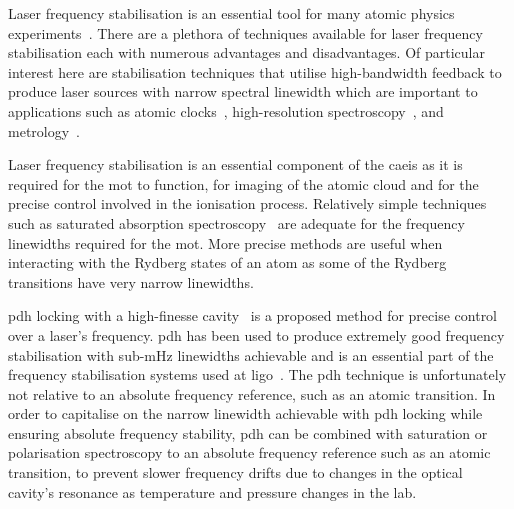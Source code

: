 
Laser frequency stabilisation is an essential tool for many atomic physics experiments~\cite{fox_1._2003,anderson_observation_1995,demarco_onset_1999,uetake_high_2008,ye_stable_2010,akamatsu_narrow_2012}.
There are a plethora of techniques available for laser frequency stabilisation each with numerous advantages and disadvantages.
Of particular interest here are stabilisation techniques that utilise high-bandwidth feedback to produce laser sources with narrow spectral linewidth which are important to applications such as atomic clocks~\cite{ludlow_sr_2008}, high-resolution spectroscopy~\cite{rafac_sub-dekahertz_2000}, and metrology~\cite{metcalf_laser_1999,ye_quantum_2008}.

Laser frequency stabilisation is an essential component of the \gls{caeis} as it is required for the \gls{mot} to function, for imaging of the atomic cloud and for the precise control involved in the ionisation process.
Relatively simple techniques such as saturated absorption spectroscopy~\cite{haroche_theory_1972,preston_doppler-free_1996,maguire_theoretical_2006} are adequate for the frequency linewidths required for the \gls{mot}.
More precise methods are useful when interacting with the Rydberg states of an atom as some of the Rydberg transitions have very narrow linewidths.

\Gls{pdh} locking with a high-finesse cavity~\cite{drever_laser_1983} is a proposed method for precise control over a laser's frequency.
\Gls{pdh} has been used to produce extremely good frequency stabilisation with sub-\unit[40]{mHz} linewidths achievable and is an essential part of the frequency stabilisation systems used at \gls{ligo}~\cite{ludlow_compact_2007,kessler_sub-40-mhz-linewidth_2012,abramovici_ligo:_1992,black_introduction_2000}.
The \gls{pdh} technique is unfortunately not relative to an absolute frequency reference, such as an atomic transition.
In order to capitalise on the narrow linewidth achievable with \gls{pdh} locking while ensuring absolute frequency stability, \gls{pdh} can be combined with saturation or polarisation spectroscopy to an absolute frequency reference such as an atomic transition, to prevent slower frequency drifts due to changes in the optical cavity's resonance as temperature and pressure changes in the lab.

